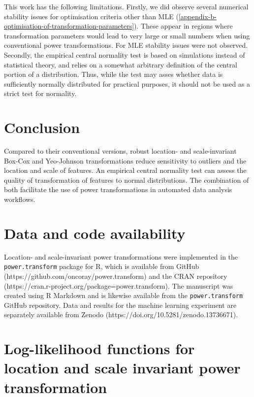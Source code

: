 \documentclass[preprint,12pt,authoryear]{elsarticle}
\begin{document}
This work has the following limitations. Firstly, we did observe several
numerical stability issues for optimisation criteria other than MLE
(\ref{appendix-b-optimisation-of-transformation-parameters}).
These appear in regions where transformation parameters
would lead to very large or small numbers when using conventional power
transformations. For MLE stability issues were not observed. Secondly,
the empirical central normality test is based on simulations instead of
statistical theory, and relies on a somewhat arbitrary definition of the
central portion of a distribution. Thus, while the test may asses
whether data is sufficiently normally distributed for practical
purposes, it should not be used as a strict test for normality.

\section{Conclusion}\label{conclusion}

Compared to their conventional versions, robust location- and
scale-invariant Box-Cox and Yeo-Johnson transformations reduce
sensitivity to outliers and the location and scale of features. An
empirical central normality test can assess the quality of
transformation of features to normal distributions. The combination of
both facilitate the use of power transformations in automated data
analysis workflows.

\section{Data and code availability}\label{data-and-code-availability}

Location- and scale-invariant power transformations were implemented in
the \texttt{power.transform} package for R, which is available from
GitHub (https://github.com/oncoray/power.transform) and the CRAN
repository (https://cran.r-project.org/package=power.transform).
The manuscript was created using R Markdown and is likewise
available from the \texttt{power.transform} GitHub repository. Data and
results for the machine learning experiment are separately available
from Zenodo (https://doi.org/10.5281/zenodo.13736671).


\appendix
\section{Log-likelihood functions for location and scale
invariant power transformation}\label{appendix-a-log-likelihood-functions-for-location-and-scale-invariant-power-transformation}
\end{document}
